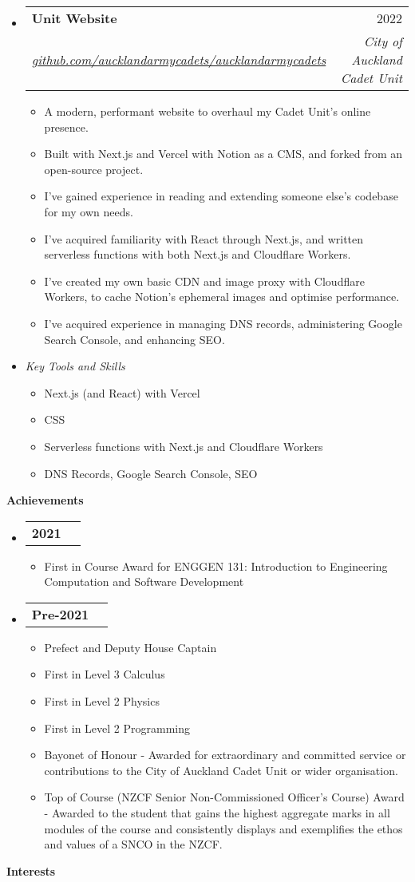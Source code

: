 \documentclass[11pt,a4paper]{article}[leftmargin=*]
\makeatletter
\def \entryspacing {-0pt}
\renewcommand{\section}[2]{\vspace{5pt}
  \colorbox{secondary}{\color{white}\raggedbottom\normalsize\textbf{{#1}{\hspace{7pt}#2}}}
}
\newcommand{\resumeEntryStart}{\begin{itemize}[leftmargin=2.5mm]}
\newcommand{\resumeEntryEnd}{\end{itemize}\vspace{\entryspacing}}
\newcommand{\resumeItemListStart}{\begin{itemize}[leftmargin=4.5mm]}
\newcommand{\resumeItemListEnd}{\end{itemize}}
\newcommand{\resumeItem}[1]{
  \item\small{
    {#1 \vspace{-2pt}}
  }
}
\newcommand{\resumeEntryTSDL}[4]{
  \vspace{-1pt}\item[]
    \begin{tabularx}{0.97\textwidth}{X@{\hspace{60pt}}r}
      \textbf{\color{primary}#1} & {\firabook\color{accent}\small#2} \\
      \textit{\color{accent}\small#3} & \textit{\color{accent}\small#4} \\
    \end{tabularx}\vspace{-6pt}
}
\newcommand{\resumeEntryTD}[2]{
  \vspace{-1pt}\item[]
    \begin{tabularx}{0.97\textwidth}{X@{\hspace{60pt}}r}
      \textbf{\color{primary}#1} & {\firabook\color{accent}\small#2} \\
    \end{tabularx}\vspace{-6pt}
}
\newcommand{\resumeEntryE}[1]{
  \item[]\small{
    \textit{\color{accent}\small#1 \vspace{-6pt}}
  }\\
}
\makeatother
\begin{document}
\resumeEntryStart
\resumeEntryTSDL
{Unit Website}{2022}
{\href{https://github.com/aucklandarmycadets/aucklandarmycadets}{github.com/aucklandarmycadets/aucklandarmycadets}}{City of Auckland Cadet Unit}
\resumeItemListStart
\resumeItem {A modern, performant website to overhaul my Cadet Unit's online presence.}
\resumeItem {Built with Next.js and Vercel with Notion as a CMS, and forked from an open-source project.}
\resumeItem {I've gained experience in reading and extending someone else's codebase for my own needs.}
\resumeItem {I've acquired familiarity with React through Next.js, and written serverless functions with both Next.js and Cloudflare Workers.}
\resumeItem {I've created my own basic CDN and image proxy with Cloudflare Workers, to cache Notion's ephemeral images and optimise performance.}
\resumeItem {I've acquired experience in managing DNS records, administering Google Search Console, and enhancing SEO.}
\resumeItemListEnd
\resumeEntryE{Key Tools and Skills}
\resumeItemListStart
\resumeItem {Next.js (and React) with Vercel}
\resumeItem {CSS}
\resumeItem {Serverless functions with Next.js and Cloudflare Workers}
\resumeItem {DNS Records, Google Search Console, SEO}
\resumeItemListEnd
\resumeEntryEnd


\section{\faTrophy}{Achievements}

\resumeEntryStart
\resumeEntryTD{2021}{}
\resumeItemListStart
\resumeItem {First in Course Award for ENGGEN 131: Introduction to Engineering Computation and Software Development}
\resumeItemListEnd
\resumeEntryEnd

\resumeEntryStart
\resumeEntryTD{Pre-2021}{}
\resumeItemListStart
\resumeItem {Prefect and Deputy House Captain}
\resumeItem {First in Level 3 Calculus}
\resumeItem {First in Level 2 Physics}
\resumeItem {First in Level 2 Programming}
\resumeItem {Bayonet of Honour - Awarded for extraordinary and committed service or contributions to the City of Auckland Cadet Unit or wider organisation.}
\resumeItem {Top of Course (NZCF Senior Non-Commissioned Officer's Course) Award - Awarded to the student that gains the highest aggregate marks in all modules of the course and consistently displays and exemplifies the ethos and values of a SNCO in the NZCF.}
\resumeItemListEnd
\resumeEntryEnd


\section{\faUserCircle}{Interests}
\end{document}
